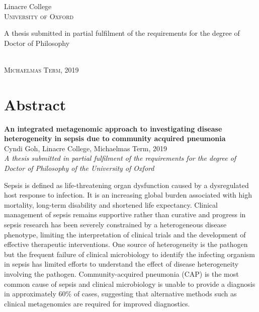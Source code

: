 \begin{titlepage}
\begin{center}
{\Large Linacre College}\\
\vspace{4mm}
{\large\textsc{University of Oxford}}\\
\vspace{10mm}

\begin{minipage}{10cm}
\begin{center}
{\large A thesis submitted in partial fulfilment of the requirements for the degree of Doctor of Philosophy}
\end{center}
\end{minipage}\\

\vspace{9mm}
{\large\textsc{Michaelmas Term, 2019}}
\vspace{12mm}

\end{center}
\end{titlepage}

\newpage

\chapter*{Abstract} %
\thispagestyle{plain}
 \setcounter{page}{1}
\onehalfspacing
\vspace*{0.4cm}
\begin{center}
{\large\bf An integrated metagenomic approach to investigating disease heterogeneity in sepsis due to community acquired pneumonia} \\
{Cyndi Goh, Linacre College, Michaelmas Term, 2019}\\
\vspace*{0.4cm}
{\itshape A thesis submitted in partial fulfilment of the requirements
for the degree of Doctor of Philosophy of the University of Oxford} \\
\vspace*{0.4cm}
\end{center}

\singlespacing

Sepsis is defined as life-threatening organ dysfunction caused by a dysregulated host response to infection. It is an increasing global burden associated with high mortality, long-term disability and shortened life expectancy. Clinical management of sepsis remains supportive rather than curative and progress in sepsis research has been severely constrained by a heterogeneous disease phenotype, limiting the interpretation of clinical trials and the development of effective therapeutic interventions. One source of heterogeneity is the pathogen but the frequent failure of clinical microbiology to identify the infecting organism in sepsis has limited efforts to understand the effect of disease heterogeneity involving the pathogen. Community-acquired pneumonia (CAP) is the most common cause of sepsis and clinical microbiology is unable to provide a diagnosis in approximately 60\% of cases, suggesting that alternative methods such as clinical metagenomics are required for improved diagnostics. 

